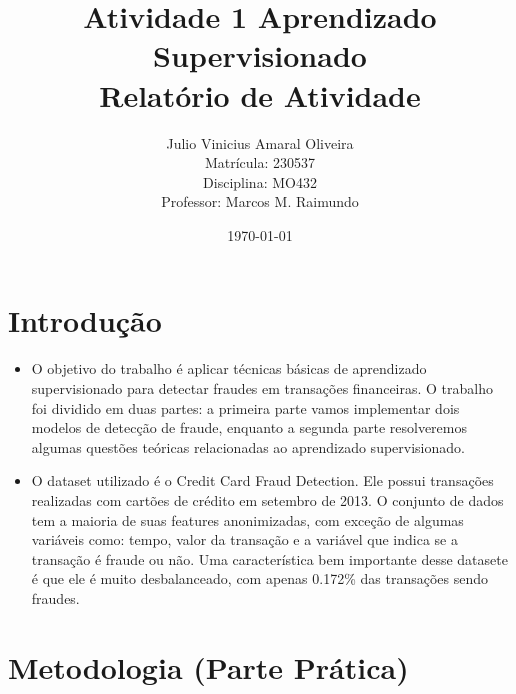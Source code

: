 \documentclass[a4paper,12pt]{article}
\title{Atividade 1 Aprendizado Supervisionado \\ \large Relatório de Atividade}
\author{Julio Vinicius Amaral Oliveira \\ Matrícula: 230537 \\ Disciplina: MO432 \\ Professor: Marcos M. Raimundo}
\date{\today}
\begin{document}
\maketitle
\thispagestyle{empty}

\newpage
\tableofcontents
\thispagestyle{empty}

\newpage
{}

\section{Introdução}
\label{sec:introducao}
\begin{itemize}
  \item O objetivo do trabalho é aplicar técnicas básicas de aprendizado supervisionado para detectar fraudes em transações financeiras. O trabalho foi dividido em duas partes: a primeira parte vamos implementar dois modelos de detecção de fraude, enquanto a segunda parte resolveremos algumas questões teóricas relacionadas ao aprendizado supervisionado.
  \item O dataset utilizado é o Credit Card Fraud Detection. Ele possui transações realizadas com cartões de crédito em setembro de 2013. O conjunto de dados tem a maioria de suas features anonimizadas, com exceção de algumas variáveis como: tempo, valor da transação e a variável que indica se a transação é fraude ou não. Uma característica bem importante desse datasete é que ele é muito desbalanceado, com apenas 0.172\% das transações sendo fraudes.
\end{itemize}

\section{Metodologia (Parte Prática)}
\label{sec:metodologia}
\end{document}
